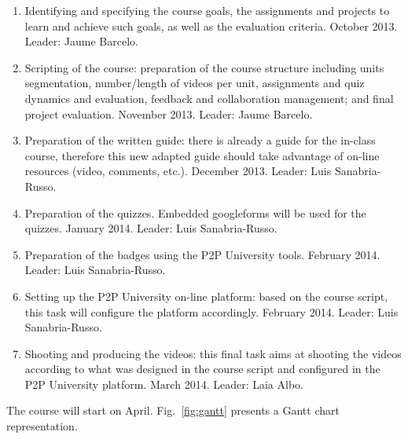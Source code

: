 \documentclass[a4paper,oneside]{book}   %
\begin{document}
\begin{enumerate}
    \item Identifying and specifying the course goals, the assignments and projects to learn and achieve such goals, as well as the evaluation criteria. October 2013. Leader: Jaume Barcelo.
	\item Scripting of the course: preparation of the course structure including units segmentation, number/length of videos per unit, assignments and quiz dynamics and evaluation, feedback and collaboration management; and final project evaluation. November 2013. Leader: Jaume Barcelo.
	\item Preparation of the written guide: there is already a guide for the in-class course, therefore this new adapted guide should take advantage of on-line resources (video, comments, etc.). December 2013. Leader: Luis Sanabria-Russo.
    \item Preparation of the quizzes. 
    Embedded googleforms will be used for the quizzes. January 2014. Leader: Luis Sanabria-Russo.
    \item Preparation of the badges using the P2P University tools. February 2014. Leader: Luis Sanabria-Russo.
	\item Setting up the P2P University on-line platform: based on the course script, this task will configure the platform accordingly. February 2014. Leader: Luis Sanabria-Russo.
	\item Shooting and producing the videos: this final task aims at shooting the videos according to what was designed in the course script and configured in the P2P University platform. March 2014. Leader: Laia Albo.
\end{enumerate}

The course will start on April.
Fig.~\ref{fig:gantt} presents a Gantt chart representation.
\end{document}
